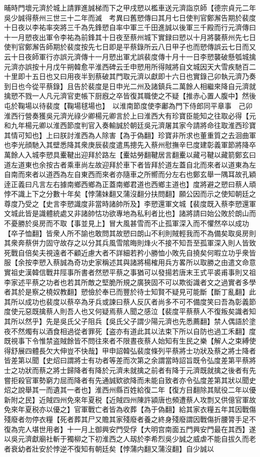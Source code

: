 晡時門壞元濟於城上請罪進誠梯而下之甲戌愬以檻車送元濟詣京師【德宗貞元二年吳少誠得蔡州三世三十二年而滅　考異曰舊愬傳曰其月七日使判官鄭澥告期於裴度十日夜以李祐率突將三千為先鋒愬自率中軍三千田進誠以後軍三千殿而行元濟傳曰十一月愬夜出軍令李祐為前鋒其十日夜至蔡州城下實録曰愬以十月將襲蔡州先七日使判官鄭澥告師期於裴度按先七日即是平蔡錄所云八日甲子也而愬傳誤云七日而又云十日夜師軍行亦誤元濟傳十一月愬出軍尤誤裴度傳十月十一日李愬襲破懸瓠城擒元濟亦誤按十月戊午朔韓愈平淮西碑云壬申愬用所得賊將自文城因天大雪疾馳百二十里即十五日也又曰用夜半到蔡破其門取元濟以獻即十六日也實錄己卯執元濟乃奏到日也今從平蔡錄】且告於裴度是日申光二州及諸鎮兵二萬餘人相繼來降自元濟就擒愬不戮一人凡元濟官吏帳下厨廐之卒皆復其職使之不疑【推赤心置人腹中】然後屯於鞠場以待裴度【鞠場毬場也】　以淮南節度使李鄘為門下侍郎同平章事　己卯淮西行營奏獲吳元濟光祿少卿楊元卿言於上曰淮西大有珍寶臣能知之往取必得【元和九年楊元卿以淮西節度判官入奏輸誠於朝廷吳元濟屠其家今請將命往取淮西珍寶其情可知也】上曰朕討淮西為人除害【為于偽翻】珍寶非所求也董重質之去洄曲軍也李光顔馳入其壁悉降其衆庚辰裴度遣馬摠先入蔡州慰撫辛巳度建彰義軍節將降卒萬餘人入城李愬具櫜鞬出迎拜於路左【櫜姑勞翻鞬居言翻櫜以藏弓鞬以藏箭鄭玄曰道左道東也余按古者乘車尚左故迎拜於車下者皆拜於道左蓋自北而來者以道東為左自南而來者以道西為左自東西而來者亦隨車之所嚮而分左右也鄭玄舉一隅耳故孔穎逹正義曰凡言左右據南鄉西鄉為正蓋南鄉君道也西鄉主道也】度將避之愬曰蔡人頑悖不識上下之分數十年矣【悖蒲妹翻又蒲沒翻分扶問翻】願公因而示之使知朝廷之尊度乃受之【史言李愬識度非當時諸帥所及】李愬還軍文城【裴度既入蔡李愬還軍文城此皆是識體統處又非諸帥怙功欲專地為私利者比也】諸將請曰始公敗於朗山而不憂勝於吳房而不取【事並見上】冒大風甚雪而不止孤軍深入而不懼然卒以成功【卒子恤翻】皆衆人所不諭也敢問其故愬曰朗山不利則賊輕我而不為備矣取吳房則其衆奔蔡併力固守故存之以分其兵風雪隂晦則烽火不接不知吾至孤軍深入則人皆致死戰自倍矣夫視遠者不顧近慮大者不詳細若矜小勝恤小敗先自撓矣何暇立功乎衆皆服【余按李愬入蔡誠為奇功史家稱述其與諸將楊榷用兵方畧所以取勝之由遣文命意實祖史漢韓信戰井陘事所書者然愬平蔡之事猶可以發揚若唐末王式平裘甫事則又祖李家述平蔡之功者也若其所敵之堅脆所規之廣狹固不可以欺衒識者文之過實者多學者其於是察之橈奴教翻】愬儉於奉已而豐於待士知賢不疑見可能斷【斷丁亂翻】此其所以成功也裴度以蔡卒為牙兵或諫曰蔡人反仄者尚多不可不備度笑曰吾為彰義節度使元惡既擒蔡人則吾人也又何疑焉蔡人聞之感泣【裴度平蔡蔡人不復叛矣識者知其所以然乎】先是吳氏父子阻兵【吳氏父子謂少陽元濟也先悉薦翻】禁人偶語於塗夜不然燭有以酒食相過從者罪死【盗亦有道此其以法束下所以自防也過工禾翻】度既視事下令惟禁盗賊餘皆不問往來者不限晝夜蔡人始知有生民之樂【解人之束縛使得舒展四體長欠大伸豈不快哉】甲申詔韓弘裴度條列平蔡將士功狀及蔡之將士降者皆差第以聞【史炤曰謂將士有功者等差而次第之余謂當時詔旨既令弘度差第平蔡將士之功狀而蔡之將士歸降者有降於元濟未就擒之前者有降于元濟既就擒之後者有先嘗拒殺官軍勢窮力屈而降者有先通誠欵欲降而未能自致者亦令弘度差第其狀以聞史炤之說舉其一而遺其一者也】淮西州縣百姓給復二年【復方目翻除其賦役二年以優新附之民】近賊四州免來年夏税【近賊四州陳許潁唐也頻遭蔡人攻剽又供億官軍故免來年夏税亦以優之】官軍戰亡者皆為收葬【為于偽翻】給其家衣糧五年其因戰傷殘廢者勿停衣糧【死者葬其尸又贍其家殘廢者養之終身殘廢謂因戰傷折腰膂手足不復為完人堪世用者】十一月上御興安門受俘【大明宫南面五門興安門最在其西】遂以吳元濟獻廟社斬于獨柳之下初淮西之人刼於李希烈吳少誠之威虐不能自拔久而老者衰幼者壯安於悖逆不復知有朝廷矣【悖蒲内翻又蒲沒翻】自少誠以